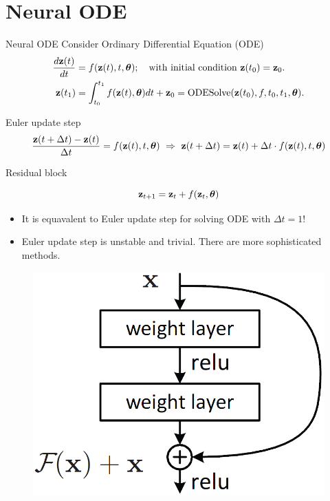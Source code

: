 \section{Neural ODE}
\begin{frame}{Neural ODE}
	Consider Ordinary Differential Equation (ODE)
	\begin{align*}
	    \frac{d \mathbf{z}(t)}{dt} &= f(\mathbf{z}(t), t, \boldsymbol{\theta}); \quad \text{with initial condition }\mathbf{z}(t_0) = \mathbf{z}_0. \\
	    \mathbf{z}(t_1) &= \int^{t_1}_{t_0} f(\mathbf{z}(t), \boldsymbol{\theta}) d t  + \mathbf{z}_0 = \text{ODESolve}(\mathbf{z}(t_0), f, t_0,t_1, \boldsymbol{\theta}).
	\end{align*}
	\vspace{-0.4cm}
	\begin{block}{Euler update step}
		\vspace{-0.6cm}
		\[
		    \frac{\mathbf{z}(t + \Delta t) - \mathbf{z}(t)}{\Delta t} = f(\mathbf{z}(t), t, \boldsymbol{\theta}) \,\, \Rightarrow \,\, \mathbf{z}(t + \Delta t) = \mathbf{z}(t) + \Delta t \cdot f(\mathbf{z}(t), t, \boldsymbol{\theta})
		\]
		\vspace{-0.7cm}
	\end{block}
	\begin{block}{Residual block}
		\begin{minipage}[t]{0.7\columnwidth}
			\vspace{-0.4cm}
			\[
				\mathbf{z}_{t + 1} = \mathbf{z}_t + f(\mathbf{z}_t, \boldsymbol{\theta})
			\]
			\vspace{-0.6cm}
			\begin{itemize}
				 \item It is equavalent to Euler update step for solving ODE with $\Delta t = 1$!
				 \item Euler update step is unstable and trivial. There are more sophisticated methods.
			\end{itemize}
		\end{minipage}%
		\begin{minipage}[t]{0.3\columnwidth}
			\vspace{-0.2cm}
			\begin{figure}
			    \centering
			    \includegraphics[width=\linewidth]{figs/resnet_1.png}

\end{figure}
\end{minipage}
\end{block}
\end{frame}
